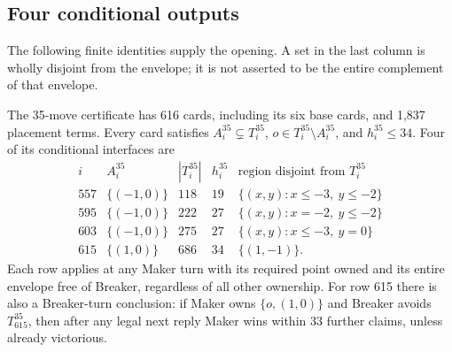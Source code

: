 \subsection{Four conditional outputs}
\label{r35:outputs}

The following finite identities supply the opening.  A set in the last
column is wholly disjoint from the envelope; it is not asserted to be
the entire complement of that envelope.

\begin{proposition}\label{r35:conditional}
The 35-move certificate has 616 cards, including its six base cards,
and 1,837 placement terms.  Every card satisfies
\(A_i^{35}\subsetneq T_i^{35}\),
\(o\in T_i^{35}\setminus A_i^{35}\), and \(h_i^{35}\le34\).
Four of its conditional interfaces are
\begin{equation}\label{r35:conditional-table}
\begin{array}{c|c|r|r|l}
 i&A_i^{35}&|T_i^{35}|&h_i^{35}&\text{region disjoint from }T_i^{35}\\ \hline
 557&\{(-1,0)\}&118&19&\{(x,y):x\le-3,\ y\le-2\}\\
 595&\{(-1,0)\}&222&27&\{(x,y):x=-2,\ y\le-2\}\\
 603&\{(-1,0)\}&275&27&\{(x,y):x\le-3,\ y=0\}\\
 615&\{(1,0)\}&686&34&\{(1,-1)\}.
\end{array}
\end{equation}
Each row applies at any Maker turn with its required point owned and
its entire envelope free of Breaker, regardless of all other ownership.
For row 615 there is also a Breaker-turn conclusion: if Maker owns
\(\{o,(1,0)\}\) and Breaker avoids \(T_{615}^{35}\), then after any
legal next reply Maker wins within 33 further claims, unless already
victorious.
\end{proposition}

